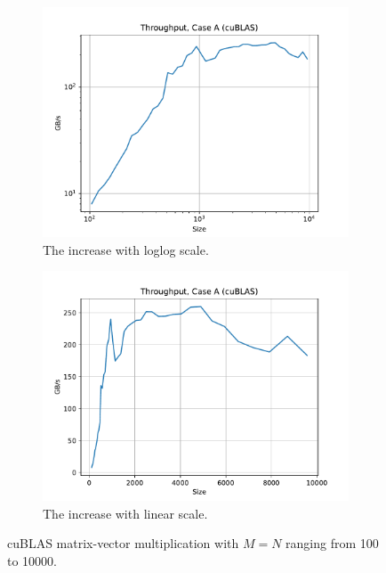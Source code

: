 \documentclass[9pt]{article}
\begin{document}
\begin{figure}[!ht]
    \centering
    \begin{subfigure}[b]{0.49\textwidth}
        \centering
        \includegraphics[width=\linewidth]{figs/case_a_cublas_loglog.pdf}
        \caption{The increase with loglog scale.}
        \label{fig:cublas_loglog}
    \end{subfigure}\hfill
    \begin{subfigure}[b]{0.49\textwidth}
        \centering
        \includegraphics[width=\linewidth]{figs/case_a_cublas_linear.pdf}
	\caption{The increase with linear scale.}
	\label{fig:cublas_linear}
    \end{subfigure}\hfill
    \caption{cuBLAS matrix-vector multiplication with $M=N$ ranging from 100 to 10000.}
    \label{fig:case_a_cublas_mv_mult}
\end{figure}
\end{document}
